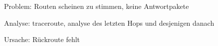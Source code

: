 \begin{notes}
\item Problem: Routen scheinen zu stimmen, keine Antwortpakete
\item Analyse: traceroute, analyse des letzten Hops und desjenigen danach
\item Ursache: Rückroute fehlt
\end{notes}




